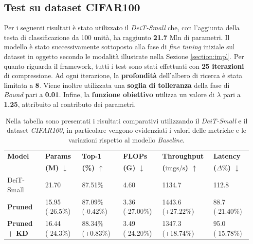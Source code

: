 \subsection{Test su dataset CIFAR100}
\label{deit_cifar100}
Per i seguenti risultati è stato utilizzato il \textit{DeiT-Small} che, con
l'aggiunta della testa di classificazione da 100 unità, ha raggiunto
\textbf{21.7} Mln di parametri. Il modello è stato successivamente sottoposto
alla fase di \textit{fine tuning} iniziale sul dataset in oggetto secondo le
modalità illustrate nella Sezione \ref{section:impl}. Per quanto riguarda il
framework, tutti i test sono stati effettuati con \textbf{25 iterazioni} di
compressione. Ad ogni iterazione, la \textbf{profondità} dell'albero di ricerca
è stata limitata a \textbf{8}. Viene inoltre utilizzata una \textbf{soglia di
    tolleranza} della fase di \textit{Bound} pari a \textbf{0.01}. Infine, la
\textbf{funzione obiettivo} utilizza un valore di \textbf{$\lambda$} pari a
\textbf{1.25}, attribuito al contributo dei parametri.
\begin{table}[H]
    \centering
    \footnotesize
    \setlength{\tabcolsep}{4pt}
    \begin{tabular}{@{} l l l l l l @{}}
        \toprule
        \textbf{Model} & \textbf{Params} & \textbf{Top-1} & \textbf{FLOPs} & \textbf{Throughput} & \textbf{Latency} \\ 
                       & \textbf{(M) $\downarrow$}    & \textbf{(\%) $\uparrow$}  & \textbf{(G) $\downarrow$}   & \textbf{($\text{imgs}/\text{s}$) $\uparrow$} & \textbf{($\Delta\%$) $\downarrow$} \\ 
        \midrule
        DeiT-Small           & 21.70 \hphantom{(-00.0\%)}                 & 87.51\% \hphantom{(-0.00\%)}                 & 4.60 \hphantom{(-00.00\%)}          & 1134.7 \hphantom{(+00.00\%)}                    & 112.8 \hphantom{(-00.00\%)}               \\
        \midrule
        \textbf{Pruned}      & 15.95 (-26.5\%)                            & 87.09\% (-0.42\%)                            & 3.36 (-27.00\%)                     & 1443.6 (+27.22\%)                               & 88.7 (-21.40\%)                           \\
        \midrule
        \textbf{Pruned + KD} & 16.44 (-24.3\%)                            & 88.34\% (+0.83\%)                            & 3.49 (-24.20\%)                     & 1347.3 (+18.74\%)                               & 95.0 (-15.78\%)                           \\
        \bottomrule
    \end{tabular}
    \vspace{10pt}
    \caption{Nella tabella sono presentati i risultati comparativi utilizzando il \textit{DeiT-Small} e il dataset \textit{CIFAR100}, in particolare vengono evidenziati i valori delle metriche e le variazioni rispetto al modello \textit{Baseline}.}
    \label{tab:risultati-cifar100-deit}
\end{table}
